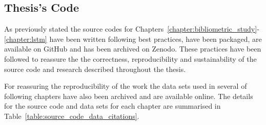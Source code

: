 
\subsection{Thesis's Code}

As previously stated the source codes for
Chapters~\ref{chapter:bibliometric_study}-\ref{chapter:lstm} have been written
following best practices, have been packaged, are available on GitHub and has
been archived on Zenodo. These practices have been followed to reassure the the
correctness, reproducibility and sustainability of the source code and research
described throughout the thesis.

For reassuring the reproducibility of the work the data sets used in several of
following chapters have also been archived and are available online. The details
for the source code and data sets for each chapter are summarised in
Table~\ref{table:source_code_data_citations}.

\begin{table}[htbp]
    \centering
    \caption{Citations and GitHub url for source code and data used in the thesis.}
    \label{table:source_code_data_citations}
\end{table}


